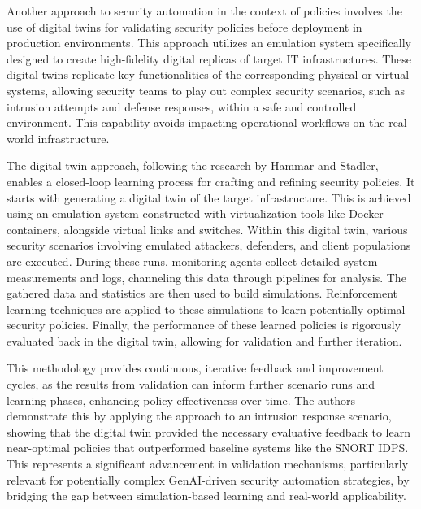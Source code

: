 Another approach to security automation in the context of policies involves the use of digital twins for validating security policies before deployment in production environments\cite{hammar_digital_2023}. This approach utilizes an emulation system specifically designed to create high-fidelity digital replicas of target IT infrastructures\cite{hammar_digital_2023}. These digital twins replicate key functionalities of the corresponding physical or virtual systems, allowing security teams to play out complex security scenarios, such as intrusion attempts and defense responses, within a safe and controlled environment\cite{hammar_digital_2023}. This capability avoids impacting operational workflows on the real-world infrastructure\cite{hammar_digital_2023}.

The digital twin approach, following the research by Hammar and Stadler, enables a closed-loop learning process for crafting and refining security policies\cite{hammar_digital_2023}. It starts with generating a digital twin of the target infrastructure. This is achieved using an emulation system constructed with virtualization tools like Docker containers, alongside virtual links and switches\cite{hammar_digital_2023}. Within this digital twin, various security scenarios involving emulated attackers, defenders, and client populations are executed\cite{hammar_digital_2023}. During these runs, monitoring agents collect detailed system measurements and logs, channeling this data through pipelines for analysis\cite{hammar_digital_2023}. The gathered data and statistics are then used to build simulations\cite{hammar_digital_2023}. Reinforcement learning techniques are applied to these simulations to learn potentially optimal security policies\cite{hammar_digital_2023}. Finally, the performance of these learned policies is rigorously evaluated back in the digital twin, allowing for validation and further iteration\cite{hammar_digital_2023}.

This methodology provides continuous, iterative feedback and improvement cycles, as the results from validation can inform further scenario runs and learning phases, enhancing policy effectiveness over time\cite{hammar_digital_2023}. The authors demonstrate this by applying the approach to an intrusion response scenario, showing that the digital twin provided the necessary evaluative feedback to learn near-optimal policies that outperformed baseline systems like the SNORT IDPS\cite{zhou_study_2010}. This represents a significant advancement in validation mechanisms, particularly relevant for potentially complex GenAI-driven security automation strategies, by bridging the gap between simulation-based learning and real-world applicability\cite{hammar_digital_2023}.


